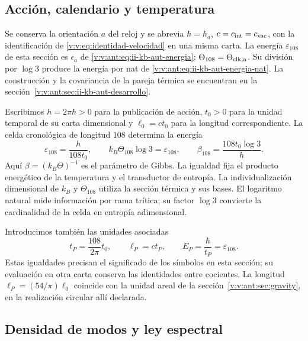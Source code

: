 

\subsection{Acción, calendario y temperatura}

Se conserva la orientación \(a\) del reloj y se abrevia
\(\hbar=\hbar_a\), \(c=c_{\rm int}=c_{\rm vac}\), con la
identificación de \eqref{v:v:eq:identidad-velocidad} en una misma carta.
La energía \(\varepsilon_{108}\) de esta sección es
\(\epsilon_a\) de \eqref{v:v:ant:eq:ii-kb-aut-energia};
\(\Theta_{108}=\Theta_{\rm clk,a}\). Su división por \(\log3\)
produce la energía por nat de \eqref{v:v:ant:eq:ii-kb-aut-energia-nat}.
La construcción y la covariancia de la pareja térmica se encuentran en
la sección~\ref{v:v:ant:sec:ii-kb-aut-desarrollo}.

Escribimos \(h=2\pi\hbar>0\) para la publicación de acción, \(t_0>0\)
para la unidad temporal de su carta dimensional y \(\ell_0=ct_0\) para
la longitud correspondiente. La celda cronológica de longitud \(108\)
determina la energía
\begin{equation}
 \varepsilon_{108}=\frac{h}{108t_0},\qquad
 k_B\Theta_{108}\log 3=\varepsilon_{108},\qquad
 \beta_{108}=\frac{108t_0\log3}{h}.
 \label{v:v:eq:energia-informacion-calendario}
\end{equation}
Aquí \(\beta=(k_B\Theta)^{-1}\) es el parámetro de Gibbs. La igualdad
fija el producto energético de la temperatura y el transductor de
entropía. La individualización dimensional de \(k_B\) y
\(\Theta_{108}\) utiliza la sección térmica y sus bases. El logaritmo
natural mide información por rama trítica; su factor \(\log3\) convierte
la cardinalidad de la celda en entropía adimensional.

Introducimos también las unidades asociadas
\begin{equation}
 t_P=\frac{108}{2\pi}t_0,\qquad
 \ell_P=ct_P,\qquad E_P=\frac{\hbar}{t_P}
 =\varepsilon_{108}.
 \label{v:v:eq:unidades-termicas-calendario}
\end{equation}
Estas igualdades precisan el significado de los símbolos en esta sección;
su evaluación en otra carta conserva las identidades entre cocientes.
La longitud \(\ell_P=(54/\pi)\ell_0\) coincide con la unidad areal
de la sección~\ref{v:v:ant:sec:gravity}, en la realización circular allí
declarada.

\subsection{Densidad de modos y ley espectral}


